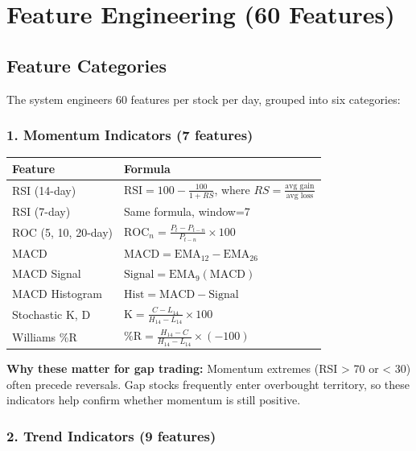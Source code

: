 \documentclass[11pt,a4paper]{article}
\begin{document}
\section{Feature Engineering (60 Features)}

\subsection{Feature Categories}

The system engineers 60 features per stock per day, grouped into six categories:

\subsubsection{1. Momentum Indicators (7 features)}

\begin{table}[h]
\centering
\begin{tabular}{ll}
\toprule
\textbf{Feature} & \textbf{Formula} \\
\midrule
RSI (14-day) & $\text{RSI} = 100 - \frac{100}{1 + RS}$, where $RS = \frac{\text{avg gain}}{\text{avg loss}}$ \\
RSI (7-day) & Same formula, window=7 \\
ROC (5, 10, 20-day) & $\text{ROC}_n = \frac{P_t - P_{t-n}}{P_{t-n}} \times 100$ \\
MACD & $\text{MACD} = \text{EMA}_{12} - \text{EMA}_{26}$ \\
MACD Signal & $\text{Signal} = \text{EMA}_9(\text{MACD})$ \\
MACD Histogram & $\text{Hist} = \text{MACD} - \text{Signal}$ \\
Stochastic K, D & $\text{K} = \frac{C - L_{14}}{H_{14} - L_{14}} \times 100$ \\
Williams \%R & $\text{\%R} = \frac{H_{14} - C}{H_{14} - L_{14}} \times (-100)$ \\
\bottomrule
\end{tabular}
\end{table}

\textbf{Why these matter for gap trading:} Momentum extremes (RSI > 70 or < 30) often precede reversals. Gap stocks frequently enter overbought territory, so these indicators help confirm whether momentum is still positive.

\subsubsection{2. Trend Indicators (9 features)}
\end{document}
